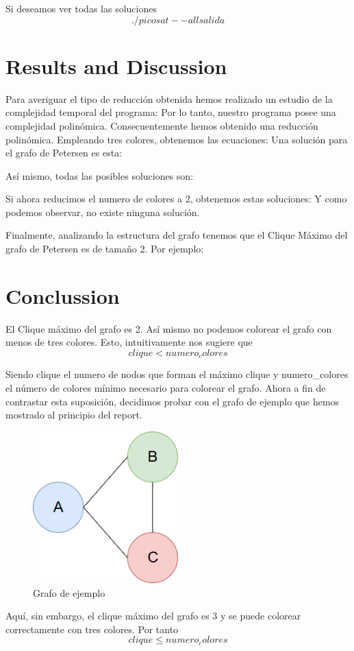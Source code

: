 \documentclass{article}
\begin{document}
        Si deseamos ver todas las soluciones 
        \[./picosat --all salida\]


\section{Results and Discussion}
    Para averiguar el tipo de reducción obtenida hemos realizado un estudio de la complejidad temporal del programa: 
    Por lo tanto, nuestro programa posee una complejidad polinómica. Consecuentemente hemos obtenido una reducción polinómica.
    Empleando tres colores, obtenemos las ecuaciones: 
    Una solución para el grafo de Petersen es esta: 

    Así mismo, todas las posibles soluciones son: 
    
    Si ahora reducimos el numero de colores a 2, obtenemos estas soluciones:
    Y como podemos observar, no existe ninguna solución.

    Finalmente, analizando la estructura del grafo tenemos que el Clique Máximo del grafo de Petersen es de tamaño 2. Por ejemplo: 

\section{Conclussion}
El Clique máximo del grafo es 2. Así mismo no podemos colorear el grafo con menos de tres colores. Esto, intuitivamente nos sugiere que 
    \[clique < numero_colores\]

Siendo clique el numero de nodos que forman el máximo clique y numero\_colores el número 
de colores mínimo necesario para colorear el grafo. Ahora a 
fin de contrastar esta suposición, decidimos probar con el grafo de ejemplo que hemos mostrado al principio del report. 
\begin{figure}[H]
    \centering
    \includegraphics[width=0.5\textwidth]{pictures/ejemplo.png}
    \caption{Grafo de ejemplo}
\end{figure}
Aquí, sin embargo, el clique máximo del grafo es 3 y se puede colorear correctamente con tres colores. Por tanto
    \[clique \leq numero_colores\]

 

\end{document}
